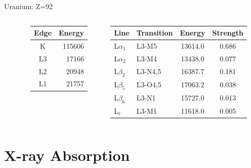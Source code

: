 \documentclass[10pt, xcolor=x11names, compress]{beamer}
\begin{document}
\begin{frame}
  \begin{block}{}
    Uranium: Z=92
  \end{block}
  \begin{columns}[T]
    \begin{column}{0.1\linewidth}
      ~
    \end{column}
    \begin{column}{0.3\linewidth}
      \begin{tabular}{cr}
        Edge &  Energy \\
        \hline
        K    & 115606  \\
        \alert{L3}   & \alert{17166}   \\
        L2   & 20948   \\
        L1   & 21757
      \end{tabular}
    \end{column}
    \begin{column}{0.6\linewidth}
      \begin{tabular}{llcc}
        Line & Transition & Energy &  Strength \\
        \hline
        L$\alpha_1$ & \alert{L3}-M5   & 13614.0 & 0.686\\
        L$\alpha_2$ & \alert{L3}-M4   & 13438.0 & 0.077\\
        L$\beta_2$  & \alert{L3}-N4,5 & 16387.7 & 0.181\\
        L$\beta_5$  & \alert{L3}-O4,5 & 17063.2 & 0.038\\
        L$\beta_6$  & \alert{L3}-N1   & 15727.0 & 0.013\\
        L$_\ell$    & \alert{L3}-M1   & 11618.0 & 0.005\\
      \end{tabular}
    \end{column}
  \end{columns}
\end{frame}


\section[XAS]{X-ray Absorption}

\end{document}
